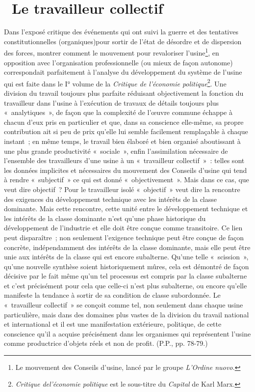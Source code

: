 \documentclass[french,twoside]{book} %
\begin{document}
\section[{ Le travailleur collectif}]{ Le travailleur collectif}
\noindent Dans l’exposé critique des événements qui ont suivi la guerre et des tentatives constitutionnelles (organiques)pour sortir de l’état de désordre et de dispersion des forces, montrer comment le mouvement pour revaloriser l’usine\footnote{Le mouvement des Conseils d’usine, lancé par le groupe \emph{L'Ordine nuovo.}}, en opposition avec l’organisation professionnelle (ou mieux de façon autonome) correspondait parfaitement à l’analyse du développement du système de l’usine qui est faite dans le I° volume de la \emph{Critique de l’économie politique}\footnote{\emph{Critique del’économie politique} est le sous-titre du \emph{Capital} de Karl Marx.}. Une division du travail toujours plus parfaite réduisant objectivement la fonction du travailleur dans l’usine à l’exécution de travaux de détails toujours plus « analytiques », de façon que la complexité de l’œuvre commune échappe à chacun d’eux pris en particulier et que, dans sa conscience elle-même, sa propre contribution ait si peu de prix qu’elle lui semble facilement remplaçable à chaque instant ; en même temps, le travail bien élaboré et bien organisé aboutissant à une plus grande productivité « sociale », enfin l’assimilation nécessaire de l’ensemble des travailleurs d’une usine à un « travailleur collectif » : telles sont les données implicites et nécessaires du mouvement des Conseils d’usine qui tend à rendre « subjectif » ce qui est donné « objectivement ». Mais dans ce cas, que veut dire objectif ? Pour le travailleur isolé « objectif » veut dire la rencontre des exigences du développement technique avec les intérêts de la classe dominante. Mais cette rencontre, cette unité entre le développement technique et les intérêts de la classe dominante n’est qu’une phase historique du développement de l’industrie et elle doit être conçue comme transitoire. Ce lien peut disparaître ; non seulement l’exigence technique peut être conçue de façon concrète, indépendamment des intérêts de la classe dominante, mais elle peut être unie aux intérêts de la classe qui est encore subalterne. Qu'une telle « scission », qu’une nouvelle synthèse soient historiquement mûres, cela est démontré de façon décisive par le fait même qu’un tel processus est compris par la classe subalterne et c’est précisément pour cela que celle-ci n’est plus subalterne, ou encore qu’elle manifeste la tendance à sortir de sa condition de classe subordonnée. Le « travailleur collectif » se conçoit comme tel, non seulement dans chaque usine particulière, mais dans des domaines plus vastes de la division du travail national et international et il est une manifestation extérieure, politique, de cette conscience qu’il a acquise précisément dans les organismes qui représentent l’usine comme productrice d’objets réels et non de profit. (P.P., pp. 78-79.)\par
{\raggedleft \noindent [1932]}
\end{document}
